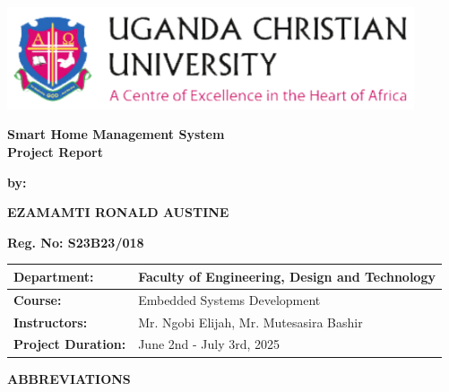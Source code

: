 \documentclass[12pt,a4paper]{report}
\begin{document}

\begin{titlepage}
    \centering
    \includegraphics[width=0.9\textwidth]{img/UCU.png}\\
    \vspace*{1.5cm}
    {\Huge\bfseries Smart Home Management System \\Project Report\par}
    \vspace{1cm}
    {\Large\textbf{by:}\par}
    \vspace{0.5cm}
    {\Large\textbf{EZAMAMTI RONALD AUSTINE}\par}
    \vspace{1cm}
    {\large \textbf{Reg. No: S23B23/018}\par}
    \vspace{1.5cm}
    
    \centering
    {\large
    \begin{tabular}{|l|l|}
    \hline
    \textbf{Department:} & Faculty of Engineering, Design and Technology\\
    \hline
    \textbf{Course:} & Embedded Systems Development \\
    \hline
    \textbf{Instructors:} & Mr. Ngobi Elijah, Mr. Mutesasira Bashir \\
    \hline
    \textbf{Project Duration:} & June 2nd - July 3rd, 2025 \\
    \hline
    \end{tabular}
    }
    
    \vspace{1cm}
\end{titlepage}

\thispagestyle{empty}
\newpage

\tableofcontents
\thispagestyle{empty}

\newpage
{}
\listoffigures
\thispagestyle{empty}

\newpage

{\fontsize{14}{16.8}\selectfont\bfseries\centering ABBREVIATIONS\par}
\vspace{10pt}
\end{document}
